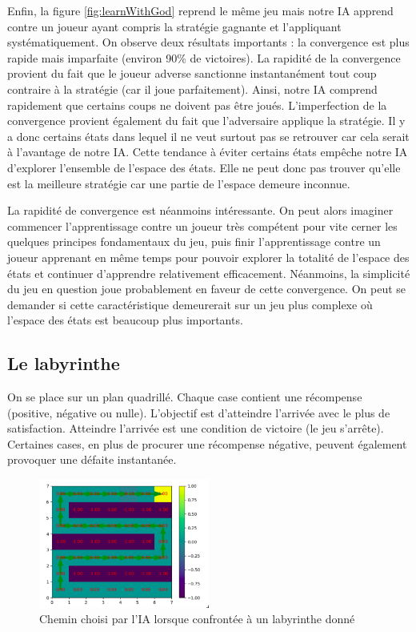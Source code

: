 Enfin, la figure \ref{fig:learnWithGod} reprend le même jeu mais notre IA apprend contre un joueur ayant compris la stratégie gagnante et l'appliquant systématiquement.
On observe deux résultats importants : la convergence est plus rapide mais imparfaite (environ 90\% de victoires). La rapidité de la convergence provient du fait
que le joueur adverse sanctionne instantanément tout coup contraire à la stratégie (car il joue parfaitement). Ainsi, notre IA comprend rapidement que certains coups 
ne doivent pas être joués. L'imperfection de la convergence provient également du fait que l'adversaire applique la stratégie. Il y a donc certains états dans lequel
il ne veut surtout pas se retrouver car cela serait à l'avantage de notre IA. Cette tendance à éviter certains états empêche notre IA d'explorer l'ensemble de l'espace 
des états. Elle ne peut donc pas trouver qu'elle est la meilleure stratégie car une partie de l'espace demeure inconnue.

La rapidité de convergence est néanmoins intéressante. On peut alors imaginer commencer l'apprentissage contre un joueur très compétent pour vite cerner les quelques
principes fondamentaux du jeu, puis finir l'apprentissage contre un joueur apprenant en même temps pour pouvoir explorer la totalité de l'espace des états et continuer
d'apprendre relativement efficacement. Néanmoins, la simplicité du jeu en question joue probablement en faveur de cette convergence. On peut se demander si cette 
caractéristique demeurerait sur un jeu plus complexe où l'espace des états est beaucoup plus importants.


\subsection{Le labyrinthe}

On se place sur un plan quadrillé. Chaque case contient une récompense (positive, négative ou nulle). L'objectif est d'atteindre l'arrivée avec le plus de satisfaction.
Atteindre l'arrivée est une condition de victoire (le jeu s'arrête). Certaines cases, en plus de procurer une récompense négative, peuvent également provoquer une 
défaite instantanée. 

\begin{figure}[h]
 \centering
 \includegraphics[width = 0.5\textwidth]{img/labyrinthe.png}
 \caption{Chemin choisi par l'IA lorsque confrontée à un labyrinthe donné}
 \label{fig:labyrinthe}
\end{figure}

